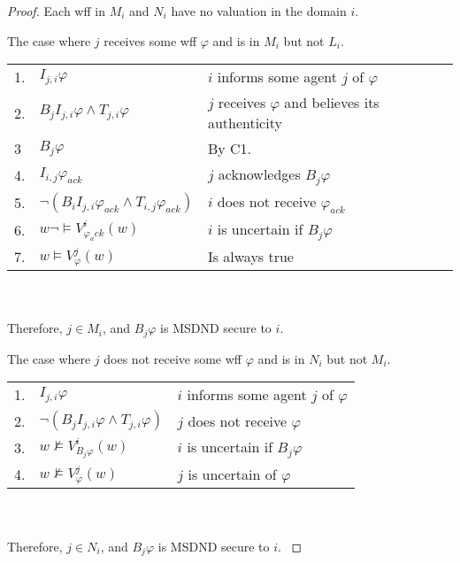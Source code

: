 \begin{proof}
Each wff in $M_i$ and $N_i$ have no valuation in the domain $i$.

\begin{case}
The case where $j$ receives some wff $\varphi$ and is in $M_i$ but not $L_i$.
\end{case}

\begin{table}[H]
\centering
\small
\begin{tabularx}{\linewidth}{l l X}
1. & $I_{j,i} \varphi$ & $i$ informs some agent $j$ of $\varphi$ \\
2. & $B_{j}I_{j,i} \varphi \wedge T_{j,i} \varphi$ & $j$ receives $\varphi$ and believes its authenticity \\
3  & $B_j \varphi$ & By C1. \\
4. & $I_{i,j} \varphi_{ack}$ & $j$ acknowledges $B_j \varphi$ \\
5. & $\neg(B_{i}I_{j,i} \varphi_{ack} \wedge T_{i,j} \varphi_{ack})$ & $i$ does not receive $\varphi_{ack}$ \\
6. & $w \neg \vDash V_{\varphi_ack}^{i}(w)$ & $i$ is uncertain if $B_j \varphi$ \\
7. & $w \vDash V_{\varphi}^{j}(w)$ & Is always true %
\end{tabularx} \\~\\
Therefore, $j \in M_i$, and $B_j \varphi$ is MSDND secure to $i$.
\label{tab:msetsecurity}
\end{table}

\begin{case}
The case where $j$ does not receive some wff $\varphi$ and is in $N_i$ but not $M_i$.
\end{case}

\begin{table}[H]
\centering
\small
\begin{tabularx}{\linewidth}{l l X}
1. & $I_{j,i} \varphi$ & $i$ informs some agent $j$ of $\varphi$ \\
2. & $\neg(B_{j}I_{j,i} \varphi \wedge T_{j,i} \varphi)$ & $j$ does not receive $\varphi$ \\
3. & $w \not \vDash V_{B_j \varphi}^{i}(w)$ & $i$ is uncertain if $B_j \varphi$ \\
4. & $w \not \vDash V_{\varphi}^{j}(w)$ & $j$ is uncertain of $\varphi$ %
\end{tabularx} \\~\\
Therefore, $j \in N_i$, and $B_j \varphi$ is MSDND secure to $i$.
\label{tab:nsetsecurity}
\end{table}
\end{proof}

